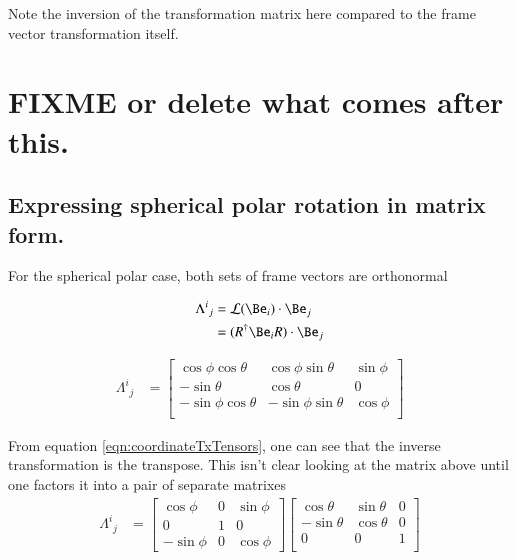 \documentclass{article}
\begin{document}
Note the inversion of the transformation matrix here compared to the frame vector transformation itself.

\section{ FIXME or delete what comes after this. }

\subsection{ Expressing spherical polar rotation in matrix form. }

For the spherical polar case, both sets of frame vectors are orthonormal

\begin{align*}
{\Lambda^i}_j
&= \LL(\Be_i) \cdot \Be_j \\
&= (R^\dagger \Be_i R) \cdot \Be_j \\
\end{align*}

\begin{align}\label{eqn:rotation}
{\Lambda^i}_j
&=
\begin{bmatrix}
\cos\phi \cos\theta & \cos\phi \sin\theta & \sin\phi \\
- \sin\theta & \cos\theta & 0 \\
- \sin\phi \cos\theta & - \sin\phi \sin\theta & \cos\phi \\
\end{bmatrix}
\end{align}

From equation \ref{eqn:coordinateTxTensors}, one can see that the inverse transformation is the transpose.  This isn't clear looking at the matrix above until one factors it into a pair of separate matrixes
\begin{align*}
{\Lambda^i}_j
&=
\begin{bmatrix}
\cos\phi & 0 & \sin\phi \\
0 & 1 & 0 \\
-\sin\phi & 0 & \cos\phi
\end{bmatrix}
\begin{bmatrix}
\cos\theta & \sin\theta & 0 \\
-\sin\theta & \cos\theta & 0 \\
0 & 0 & 1 \\
\end{bmatrix}
\end{align*}
\end{document}
